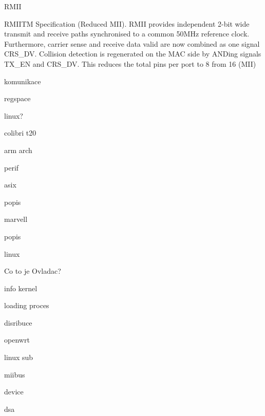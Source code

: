 

\sec RMII

RMIITM Specification (Reduced MII). RMII provides independent 2-bit wide transmit and receive paths synchronised to a common 50MHz reference clock. Furthermore, carrier sense and receive data valid are now combined  as one signal CRS\_DV. Collision detection is regenerated on the MAC side by ANDing signals TX\_EN and CRS\_DV. This reduces the total pins per port to 8 from 16 (MII)


\sec komunikace

\sec regspace

\sec linux?

\sec colibri t20

\secc arm arch



\secc perif

\sec asix

\secc popis

\sec marvell

\secc popis

\sec linux

\secc Co to je Ovladac?

\secc info kernel

\secc loading proces

\sec disribuce

\secc openwrt

\sec linux sub

\secc miibus

\secc device

\secc dsa

